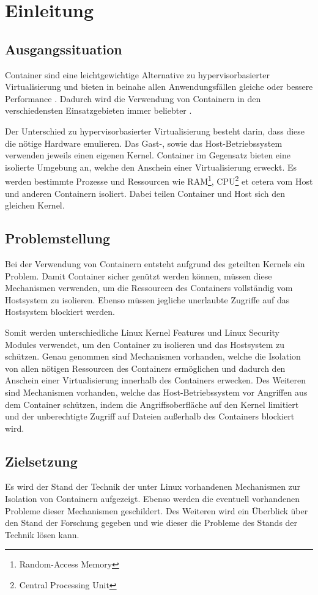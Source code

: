 \chapter{Einleitung}
\label{cha:Einleitung}

\section{Ausgangssituation}
Container sind eine leichtgewichtige Alternative zu hypervisorbasierter
Virtualisierung und bieten in beinahe allen Anwendungsfällen gleiche oder
bessere Performance \cite{ContainerPerformance}.
Dadurch wird die Verwendung von Containern in den verschiedensten
Einsatzgebieten immer beliebter \cite{ContainerAdoption}.

Der Unterschied zu hypervisorbasierter Virtualisierung besteht darin, dass
diese die nötige Hardware emulieren. Das Gast{-}, sowie das Host-Betriebssystem
verwenden jeweils einen eigenen Kernel. Container im Gegensatz bieten eine
isolierte Umgebung an, welche den Anschein einer Virtualisierung erweckt. Es
werden bestimmte Prozesse und Ressourcen wie RAM\footnote{Random-Access
Memory}, CPU\footnote{Central Processing Unit} et cetera vom Host und anderen
Containern isoliert. Dabei teilen Container und Host sich den gleichen Kernel. 

\section{Problemstellung}
Bei der Verwendung von Containern entsteht aufgrund des geteilten Kernels ein
Problem.  Damit Container sicher genützt werden können, müssen diese
Mechanismen verwenden, um die Ressourcen des Containers vollständig vom
Hostsystem zu isolieren.  Ebenso müssen jegliche unerlaubte Zugriffe auf das
Hostsystem blockiert werden.

Somit werden unterschiedliche Linux Kernel Features und Linux Security Modules
verwendet, um den Container zu isolieren und das Hostsystem zu schützen.  Genau
genommen sind Mechanismen vorhanden, welche die Isolation von allen
nötigen Ressourcen des Containers ermöglichen und dadurch den Anschein einer 
Virtualisierung innerhalb des Containers erwecken.
Des Weiteren sind Mechanismen
vorhanden, welche das Host-Betriebssystem vor Angriffen aus dem Container
schützen, indem die Angriffsoberfläche auf den Kernel limitiert und der
unberechtigte Zugriff auf Dateien außerhalb des Containers blockiert wird.  

\section{Zielsetzung}
Es wird der Stand der Technik der unter Linux vorhandenen Mechanismen zur
Isolation von Containern aufgezeigt.  Ebenso werden die eventuell vorhandenen
Probleme dieser Mechanismen geschildert. Des Weiteren wird ein Überblick über
den Stand der Forschung gegeben und wie dieser die Probleme des Stands der
Technik lösen kann.

